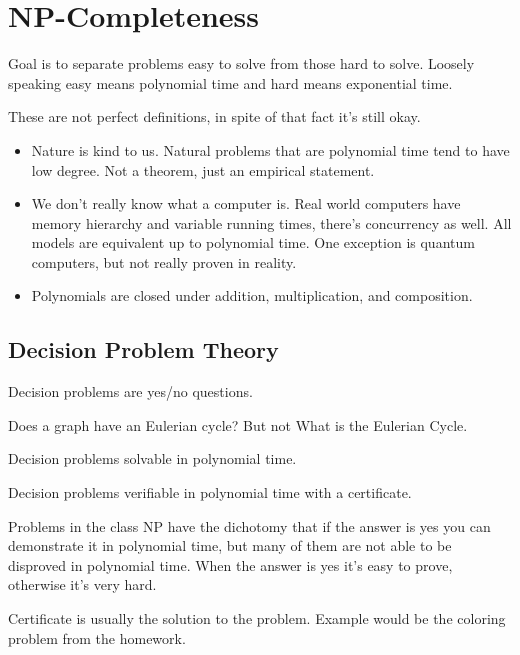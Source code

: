 \documentclass[english, 10pt]{article}
\begin{document}
\section{NP-Completeness}

Goal is to separate problems easy to solve from those hard to solve. Loosely
speaking easy means polynomial time and hard means exponential time.

These are not perfect definitions, in spite of that fact it's still okay.

\begin{itemize}
    \item Nature is kind to us. Natural problems that are polynomial time tend to have
low degree. Not a theorem, just an empirical statement.

    \item We don't really know what a computer is. Real world computers have memory
hierarchy and variable running times, there's concurrency as well. All models
are equivalent up to polynomial time. One exception is quantum computers, but
not really proven in reality.

    \item Polynomials are closed under addition, multiplication, and composition.
\end{itemize}

\subsection{Decision Problem Theory}
Decision problems are yes/no questions.

Does a graph have an Eulerian cycle? But not What is the Eulerian Cycle.

\begin{defn}[P]
    Decision problems solvable in polynomial time.
\end{defn}

\begin{defn}[NP]
    Decision problems verifiable in polynomial time with a certificate.
\end{defn}

Problems in the class NP have the dichotomy that if the answer is yes you can
demonstrate it in polynomial time, but many of them are not able to be
disproved in polynomial time. When the answer is yes it's easy to prove, otherwise it's very hard.

Certificate is usually the solution to the problem. Example would be the coloring problem from the homework.
\end{document}
